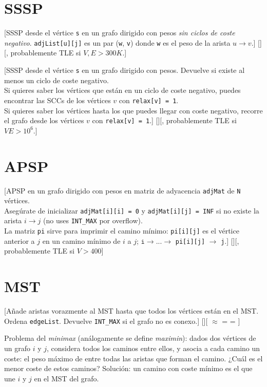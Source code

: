 \section{SSSP}
	[SSSP desde el vértice \texttt{s} en un grafo dirigido con pesos \textit{sin ciclos de coste negativo}. \texttt{adjList[u][j]} es un par (\texttt{w}, \texttt{v}) donde \texttt{w} es el peso de la arista $u \rightarrow v$.]%
	[][, probablemente TLE si $V, E > 300K$.]
	
	[SSSP desde el vértice \texttt{s} en un grafo dirigido con pesos. Devuelve si existe al menos un ciclo de coste negativo.\\
	Si quieres saber los vértices que están en un ciclo de coste negativo, puedes encontrar las SCCs de los vértices $v$ con \texttt{relax[v] = 1}.\\
	Si quieres saber los vértices hasta los que puedes llegar con coste negativo, recorre el grafo desde los vértices $v$ con \texttt{relax[v] = 1}.]%
	[][, probablemente TLE si $VE > 10^6$.]

\section{APSP}
	[APSP en un grafo dirigido con pesos en matriz de adyacencia \texttt{adjMat} de \texttt{N} vértices.\\
	Asegúrate de inicializar \texttt{adjMat[i][i] = 0} y \texttt{adjMat[i][j] = INF} si no existe la arista $i \rightarrow j$ (no uses \texttt{INT\_MAX} por overflow).\\
	La matriz \texttt{pi} sirve para imprimir el camino mínimo: \texttt{pi[i][j]} es el vértice anterior a $j$ en un camino mínimo de $i$ a $j$; $\texttt{i} \rightarrow ... \rightarrow$ \texttt{pi[i][j]} $\rightarrow$ \texttt{j}.]%
	[][, probablemente TLE si $V > 400$]

\section{MST}
	[Añade aristas vorazmente al MST hasta que todos los vértices están en el MST.\\
	Ordena \texttt{edgeList}. Devuelve \texttt{INT\_MAX} si el grafo no es conexo.]%
	[][ $\approx$  =  = ]
	
	Problema del \textit{minimax} (análogamente se define \textit{maximin}): dados dos vértices de un grafo $i$ y $j$, considera todos los caminos entre ellos, y asocia a cada camino un coste: el peso máximo de entre todas las aristas que forman el camino. ¿Cuál es el menor coste de estos caminos? Solución: un camino con coste mínimo es el que une $i$ y $j$ en el MST del grafo.

